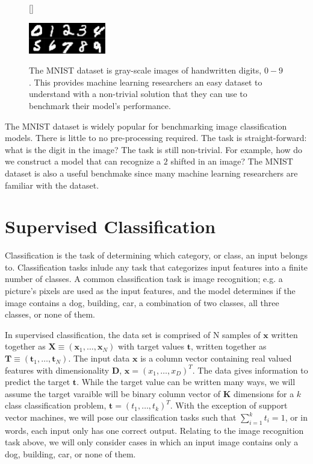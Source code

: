 \message{ !name(main.tex)}\documentclass[11pt]{article}
\begin{document}
\begin{figure}[H]
  [\FBwidth]
  {\caption{The MNIST dataset is gray-scale images of handwritten digits, $0 - 9$. This provides machine learning researchers an easy dataset to understand with a non-trivial solution that they can use to benchmark their model's performance.
    }\label{fig:mnist_ex}}{\includegraphics[width=0.3\textwidth]{img_mnist}}
\end{figure}

The MNIST dataset is widely popular for benchmarking image classification models. There is little to no pre-processing required. The task is straight-forward: what is the digit in the image? The task is still non-trivial. For example, how do we construct a model that can recognize a $2$ shifted in an image? The MNIST dataset is also a useful benchmake since many machine learning researchers are familiar with the dataset.

\section{Supervised Classification}

\par
Classification is the task of determining which category, or class, an input belongs to. Classification tasks inlude any task that categorizes input features into a finite number of classes. A common classification task is image recognition; e.g. a picture's pixels are used as the input features, and the model determines if the image contains a dog, building, car, a combination of two classes, all three classes, or none of them.

In supervised classification, the data set is comprised of N samples of $\mathbf{x}$ written together as $\mathbf{X} \equiv (\mathbf{x}_{1},\ldots,\mathbf{x}_{N})$ with target values $\mathbf{t}$, written together as $\mathbf{T} \equiv (\mathbf{t}_{1},\ldots,\mathbf{t}_{N})$. The input data $\mathbf{x}$ is a column vector containing real valued features with dimensionality \textbf{D}, $\mathbf{x} = (x_{1},\ldots,x_{D})^{T}$. The data gives information to predict the target $\mathbf{t}$. While the target value can be written many ways, we will assume the target varaible will be binary column vector of \textbf{K} dimensions for a $k$ class classification problem, $\mathbf{t} = (t_{1},\ldots,t_{k})^{T}$. With the exception of support vector machines, we will pose our classification tasks such that $\sum_{i=1}^{k} t_{i} = 1$, or in words, each input only has one correct output. Relating to the image recognition task above, we will only consider cases in which an input image contains only a dog, building, car, or none of them.
\end{document}
